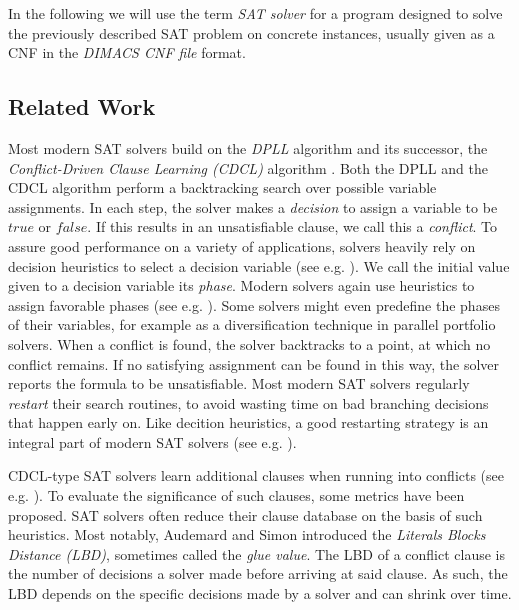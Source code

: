 \documentclass[12pt,a4paper,twoside]{scrartcl}
\numberwithin{equation}{section}
\begin{document}
In the following we will use the term \textit{SAT solver} for a program designed to solve the previously described SAT problem on concrete instances, usually given as a CNF in the \textit{DIMACS CNF file} format.

\subsection{Related Work}
\label{sec:relatedWork}

Most modern SAT solvers build on the \textit{DPLL} \cite{dpllPaper} algorithm and its successor, the \textit{Conflict-Driven Clause Learning (CDCL)} algorithm \cite{cdclSolvers}. Both the DPLL and the CDCL algorithm perform a backtracking search over possible variable assignments. In each step, the solver makes a \textit{decision} to assign a variable to be $true$ or $false$. If this results in an unsatisfiable clause, we call this a \textit{conflict}. To assure good performance on a variety of applications, solvers heavily rely on decision heuristics to select a decision variable (see e.g. \cite{biere2015evaluating, moskewicz2001chaff, biere2008adaptive}). We call the initial value given to a decision variable its \textit{phase}. Modern solvers again use heuristics to assign favorable phases (see e.g. \cite{componentPhases, cai2022better}). Some solvers might even predefine the phases of their variables, for example as a diversification technique in parallel portfolio solvers.
When a conflict is found, the solver backtracks to a point, at which no conflict remains. If no satisfying assignment can be found in this way, the solver reports the formula to be unsatisfiable. Most modern SAT solvers regularly \textit{restart} their search routines, to avoid wasting time on bad branching decisions that happen early on. Like decition heuristics, a good restarting strategy is an integral part of modern SAT solvers (see e.g. \cite{gomes1998boosting, gomes2000heavy, oh2015between}).

CDCL-type SAT solvers learn additional clauses when running into conflicts (see e.g. \cite{silva1996grasp, beame2003understanding, allUIPclauselearning, allUIPclauselearningBetter}). To evaluate the significance of such clauses, some metrics have been proposed. SAT solvers often reduce their clause database on the basis of such heuristics. Most notably, Audemard and Simon \cite{lbdPaper} introduced the \textit{Literals Blocks Distance (LBD)}, sometimes called the \textit{glue value}. The LBD of a conflict clause is the number of decisions a solver made before arriving at said clause. As such, the LBD depends on the specific decisions made by a solver and can shrink over time.
\end{document}

